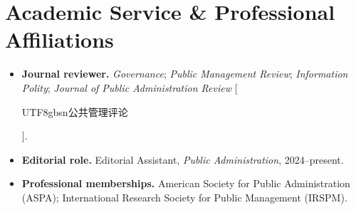 \documentclass[11pt, a4paper]{article}
\begin{document}
\section{Academic Service \& Professional Affiliations}

\begin{itemize}
    \item \textbf{Journal reviewer.}
    \textit{Governance}; \textit{Public Management Review};
    \textit{Information Polity};
    \textit{Journal of Public Administration Review} [\begin{CJK}{UTF8}{gbsn}公共管理评论\end{CJK}].

    \item \textbf{Editorial role.}
    Editorial Assistant, \textit{Public Administration}, 2024--present.

    \item \textbf{Professional memberships.}
    American Society for Public Administration (ASPA);
    International Research Society for Public Management (IRSPM).
\end{itemize}
\end{document}
